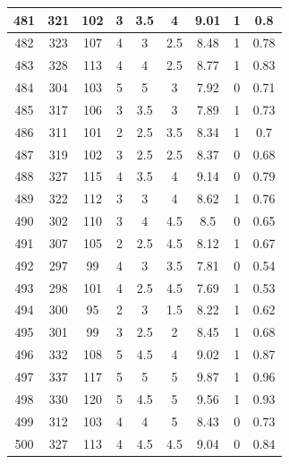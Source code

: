\documentclass[11pt]{article}
\begin{document}
\begin{appendix}
\begin{longtable}[H]{|c|c|c|c|c|c|c|c|c|}
	481        & 321       & 102         & 3                 & 3.5 & 4   & 9.01 & 1        & 0.8             \\ \hline
	482        & 323       & 107         & 4                 & 3   & 2.5 & 8.48 & 1        & 0.78            \\ \hline
	483        & 328       & 113         & 4                 & 4   & 2.5 & 8.77 & 1        & 0.83            \\ \hline
	484        & 304       & 103         & 5                 & 5   & 3   & 7.92 & 0        & 0.71            \\ \hline
	485        & 317       & 106         & 3                 & 3.5 & 3   & 7.89 & 1        & 0.73            \\ \hline
	486        & 311       & 101         & 2                 & 2.5 & 3.5 & 8.34 & 1        & 0.7             \\ \hline
	487        & 319       & 102         & 3                 & 2.5 & 2.5 & 8.37 & 0        & 0.68            \\ \hline
	488        & 327       & 115         & 4                 & 3.5 & 4   & 9.14 & 0        & 0.79            \\ \hline
	489        & 322       & 112         & 3                 & 3   & 4   & 8.62 & 1        & 0.76            \\ \hline
	490        & 302       & 110         & 3                 & 4   & 4.5 & 8.5  & 0        & 0.65            \\ \hline
	491        & 307       & 105         & 2                 & 2.5 & 4.5 & 8.12 & 1        & 0.67            \\ \hline
	492        & 297       & 99          & 4                 & 3   & 3.5 & 7.81 & 0        & 0.54            \\ \hline
	493        & 298       & 101         & 4                 & 2.5 & 4.5 & 7.69 & 1        & 0.53            \\ \hline
	494        & 300       & 95          & 2                 & 3   & 1.5 & 8.22 & 1        & 0.62            \\ \hline
	495        & 301       & 99          & 3                 & 2.5 & 2   & 8.45 & 1        & 0.68            \\ \hline
	496        & 332       & 108         & 5                 & 4.5 & 4   & 9.02 & 1        & 0.87            \\ \hline
	497        & 337       & 117         & 5                 & 5   & 5   & 9.87 & 1        & 0.96            \\ \hline
	498        & 330       & 120         & 5                 & 4.5 & 5   & 9.56 & 1        & 0.93            \\ \hline
	499        & 312       & 103         & 4                 & 4   & 5   & 8.43 & 0        & 0.73            \\ \hline
	500        & 327       & 113         & 4                 & 4.5 & 4.5 & 9.04 & 0        & 0.84            \\ \hline
	\end{longtable}

\end{appendix}
\end{document}

